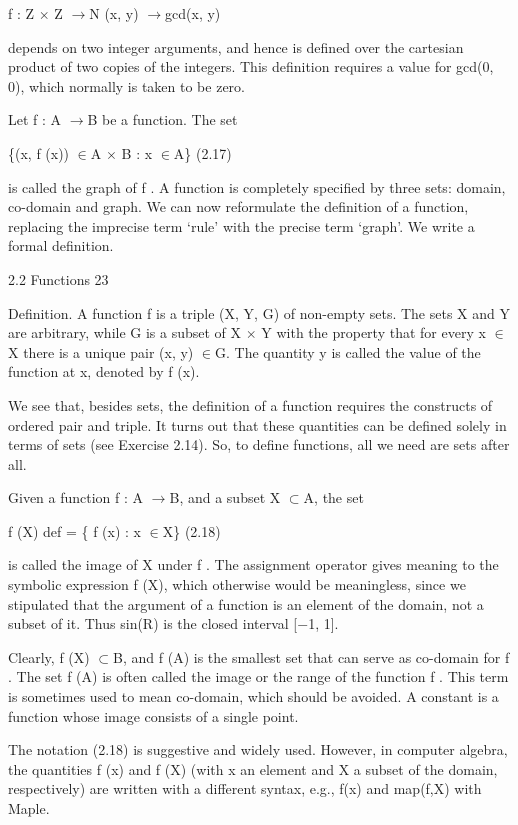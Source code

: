 \documentclass[11pt]{article}
\theoremstyle{plain}
\theoremstyle{definition}
\begin{document}
f : Z $\times$ Z $\to$N (x, y) $\to$gcd(x, y)

depends on two integer arguments, and hence is defined over the cartesian product of two copies of the integers. This definition requires a value for gcd(0, 0), which normally is taken to be zero.

Let f : A $\to$B be a function. The set

\{(x, f (x)) $\in$A $\times$ B : x $\in$A\} (2.17)

is called the graph of f . A function is completely specified by three sets: domain, co-domain and graph. We can now reformulate the definition of a function, replacing the imprecise term `rule' with the precise term `graph'. We write a formal definition.

2.2 Functions 23

Definition. A function f is a triple (X, Y, G) of non-empty sets. The sets X and Y are arbitrary, while G is a subset of X $\times$ Y with the property that for every x $\in$X there is a unique pair (x, y) $\in$G. The quantity y is called the value of the function at x, denoted by f (x).

We see that, besides sets, the definition of a function requires the constructs of ordered pair and triple. It turns out that these quantities can be defined solely in terms of sets (see Exercise 2.14). So, to define functions, all we need are sets after all.

Given a function f : A $\to$B, and a subset X $\subset$A, the set

f (X) def = \{ f (x) : x $\in$X\} (2.18)

is called the image of X under f . The assignment operator gives meaning to the symbolic expression f (X), which otherwise would be meaningless, since we stipulated that the argument of a function is an element of the domain, not a subset of it. Thus sin(R) is the closed interval [$-$1, 1].

Clearly, f (X) $\subset$B, and f (A) is the smallest set that can serve as co-domain for f . The set f (A) is often called the image or the range of the function f . This term is sometimes used to mean co-domain, which should be avoided. A constant is a function whose image consists of a single point.

The notation (2.18) is suggestive and widely used. However, in computer algebra, the quantities f (x) and f (X) (with x an element and X a subset of the domain, respectively) are written with a different syntax, e.g., f(x) and map(f,X) with Maple.
\end{document}
